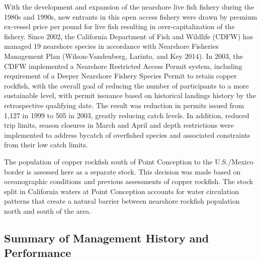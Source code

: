 \documentclass[11pt,
  english,
  a4paper,
]{article}
\begin{document}
With the development and expansion of the nearshore live fish fishery during the 1980s and 1990s, new entrants in this open access fishery were drawn by premium ex-vessel price per pound for live fish resulting in over-capitalization of the fishery. Since 2002, the California Department of Fish and Wildlife (CDFW) has managed 19 nearshore species in accordance with Nearshore Fisheries Management Plan {(Wilson-Vandenberg, Larinto, and Key 2014)\leavevmode\tagmcend\tagstructend}. In 2003, the CDFW implemented a Nearshore Restricted Access Permit system, including requirement of a Deeper Nearshore Fishery Species Permit to retain copper rockfish, with the overall goal of reducing the number of participants to a more sustainable level, with permit issuance based on historical landings history by the retrospective qualifying date. The result was reduction in permits issued from 1,127 in 1999 to 505 in 2003, greatly reducing catch levels. In addition, reduced trip limits, season closures in March and April and depth restrictions were implemented to address bycatch of overfished species and associated constraints from their low catch limits.

\leavevmode\tagmcend\tagstructend\par


The population of copper rockfish south of Point Conception to the U.S./Mexico border is assessed here as a separate stock. This decision was made based on oceanographic conditions and previous assessments of copper rockfish. The stock split in California waters at Point Conception accounts for water circulation patterns that create a natural barrier between nearshore rockfish population north and south of the area.

\leavevmode\tagmcend\tagstructend\par


\hypertarget{summary-of-management-history-and-performance}{%
\subsection{Summary of Management History and Performance}\label{summary-of-management-history-and-performance}}

\leavevmode\tagmcend\tagstructend

\end{document}
